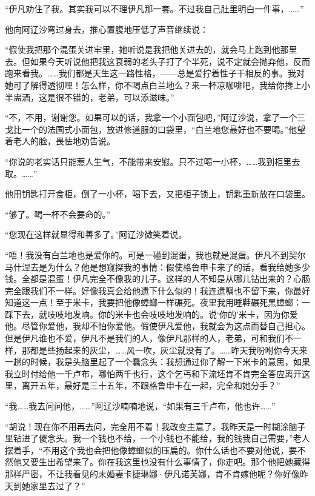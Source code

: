 \par “伊凡劝住了我。其实我可以不理伊凡那一套。不过我自己肚里明白一件事，……”
\par 他向阿辽沙弯过身去，推心置腹地压低了声音继续说：
\par “假使我把那个混蛋关进牢里，她听说是我把他关进去的，就会马上跑到他那里去。但如果今天听说他把我这衰弱的老头子打了个半死，说不定就会抛弃他，反而跑来看我。……我们都是天生这一路性格，——总是爱拧着性子干相反的事。我对她可了解得透彻哩！怎么样，你不喝点白兰地么？来一杯凉咖啡吧，我给你搀上小半盅酒，这是很不错的，老弟，可以添滋味。”
\par “不，不用，谢谢您。如果可以的话，我拿一个小面包吧，”阿辽沙说，拿了一个三戈比一个的法国式小面包，放进修道服的口袋里，“白兰地您最好也不要喝。”他望着老人的脸，畏怯地劝告说。
\par “你说的老实话只能惹人生气，不能带来安慰。只不过喝一小杯，……我到柜里去取。……”
\par 他用钥匙打开食柜，倒了一小杯，喝下去，又把柜子锁上，钥匙重新放在口袋里。
\par “够了。喝一杯不会要命的。”
\par “您现在这样就显得和善多了。”阿辽沙微笑着说。
\par “唔！我没有白兰地也是爱你的。可是一碰到混蛋，我也就是混蛋。伊凡不到契尔马什涅去是为什么？他是想窥探我的事情：假使格鲁申卡来了的话，看我给她多少钱。全都是混蛋！伊凡完全不像我的儿子。这样的人不知是从哪儿钻出来的？心肠完全跟我们不一样。好像我真会给他遗下什么似的！我连遗嘱也不留下来，你最好知道这一点！至于米卡，我要把他像蟑螂一样碾死。夜里我用睡鞋碾死黑蟑螂：一踩下去，就吱吱地发响。你的米卡也会吱吱地发响的。说‘你的’米卡，因为你爱他。尽管你爱他，我却不怕你爱他。假使伊凡爱他，我就会为这点而替自己担心。但是伊凡谁也不爱，伊凡不是我们的人，像伊凡那样的人，老弟，可和我们不一样，那都是些扬起来的灰尘，……风一吹，灰尘就没有了。……昨天我吩咐你今天来一趟的时候，我是头脑里起了一个蠢念头：我想通过你了解一下米卡的意思，如果我立时付给他一千卢布，哪怕两千也行，这个乞丐和下流坯肯不肯完全答应离开这里，离开五年，最好是三十五年，不跟格鲁申卡在一起，完全和她分手？”
\par “我……我去问问他，……”阿辽沙喃喃地说，“如果有三千卢布，他也许……”
\par “胡说！现在你不用再去问，完全用不着！我改变主意了。我昨天是一时糊涂脑子里钻进了傻念头。我一个钱也不给，一个小钱也不能给，我的钱我自己需要，”老人摆着手，“不用这个我也会把他像蟑螂似的压扁的。你什么话也不要对他说，要不然他又要生出希望来了。你在我这里也没有什么事情了，你走吧。那个他把她藏得那样严密，不让我看见的未婚妻卡捷琳娜·伊凡诺芙娜，肯不肯嫁他呢？你好像昨天到她家里去过了？”
